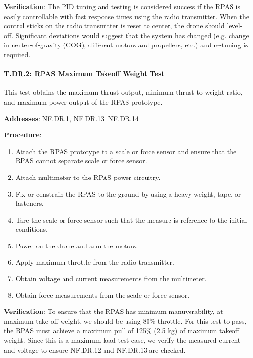 \textbf{Verification}: The PID tuning and testing is considered success if the RPAS is easily controllable with fast response times using the radio transmitter. When the control sticks on the radio transmitter is reset to center, the drone should level-off. Significant deviations would suggest that the system has changed (e.g. change in center-of-gravity (COG), different motors and propellers, etc.) and re-tuning is required. 

% 

\paragraph{\underline{T.DR.2: RPAS Maximum Takeoff Weight Test}}

This test obtains the maximum thrust output, minimum thrust-to-weight ratio, and maximum power output of the RPAS prototype.

\textbf{Addresses}:  NF.DR.1, NF.DR.13, NF.DR.14

\textbf{Procedure}:
\begin{enumerate}[noitemsep]
    \item Attach the RPAS prototype to a scale or force sensor and ensure that the RPAS cannot separate scale or force sensor.
    \item Attach multimeter to the RPAS power circuitry.
    \item Fix or constrain the RPAS to the ground by using a heavy weight, tape, or fasteners.
    \item Tare the scale or force-sensor such that the measure is reference to the initial conditions.
    \item Power on the drone and arm the motors.
    \item Apply maximum throttle from the radio transmitter.
    \item Obtain voltage and current measurements from the multimeter.
    \item Obtain force measurements from the scale or force sensor.
\end{enumerate}

\textbf{Verification}: 
To ensure that the RPAS has minimum manuverability, at maximum take-off weight, we should be using 80\% throttle. For this test to pass, the RPAS must achieve a maximum pull of 125\% (2.5 kg) of maximum takeoff weight. Since this is a maximum load test case, we verify the measured current and voltage to ensure NF.DR.12 and NF.DR.13 are checked.

% 

